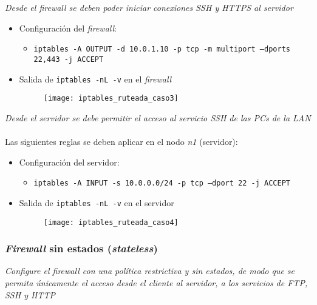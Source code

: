 \emph{Desde el firewall se deben poder iniciar conexiones SSH y HTTPS al servidor} 
~\\

\begin{itemize}
    \item Configuración del \emph{firewall}: 
    \begin{itemize}
        \item \texttt{iptables -A OUTPUT -d 10.0.1.10 -p tcp -m multiport --dports 22,443 -j ACCEPT} 
    \end{itemize}
    \item Salida de \texttt{iptables -nL -v} en el \emph{firewall}
    \begin{figure}[H]
        \centering
        \texttt{[image: iptables\_ruteada\_caso3]}
    \end{figure}
\end{itemize}

\emph{Desde el servidor se debe permitir el acceso al servicio SSH de las PCs de la LAN} 
~\\

Las siguientes reglas se deben aplicar en el nodo \emph{n1} (servidor):

\begin{itemize}
    \item Configuración del servidor:
    \begin{itemize}
        \item \texttt{iptables -A INPUT -s 10.0.0.0/24 -p tcp --dport 22 -j ACCEPT} 
    \end{itemize}
    \item Salida de \texttt{iptables -nL -v} en el servidor
    \begin{figure}[H]
        \centering
        \texttt{[image: iptables\_ruteada\_caso4]}
    \end{figure}
\end{itemize}

\subsubsection*{\emph{Firewall} sin estados (\emph{stateless})}

\emph{Configure el firewall con una política restrictiva y sin estados, de modo que se permita únicamente el acceso desde el cliente al servidor, a los servicios de FTP, SSH y HTTP} 
~\\

